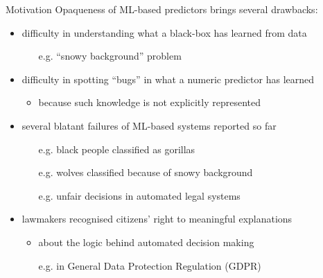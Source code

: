 \documentclass[presentation]{beamer}\mode<presentation>{\usetheme{AMSBolognaFC}}
\begin{document}
\begin{frame}[c]{Motivation}
    \alert{Opaqueness} of ML-based predictors brings several \alert{drawbacks}:
    \vfill
    \begin{itemize}
        \item difficulty in \alert{understanding} what a black-box has learned from data
        \begin{itemize}
            \item[e.g.] ``snowy background'' problem
        \end{itemize}
        
        \vfill
        
        \item difficulty in spotting ``\alert{bugs}'' in what a numeric predictor has learned
        \begin{itemize}
            \item because such knowledge is not explicitly represented
        \end{itemize}
        
        \vfill
        
        \item several blatant \alert{failures} of ML-based systems reported so far
        \begin{itemize}
            \item[e.g.] black people classified as gorillas 
            \item[e.g.] wolves classified because of snowy background 
            \item[e.g.] unfair decisions in automated legal systems 
        \end{itemize}
        
        \vfill
        
        \item lawmakers recognised citizens' \alert{right} to meaningful \alert{explanations}  
        \begin{itemize}
            \item about the \alert{logic} behind automated decision making
            \item[e.g.] in General Data Protection Regulation (\alert{GDPR}) 
        \end{itemize}
    \end{itemize}
\end{frame}
\end{document}
